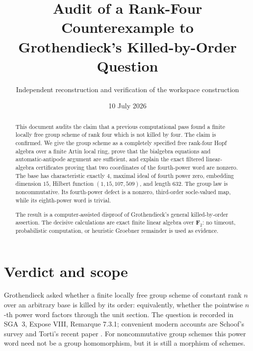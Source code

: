 \documentclass[11pt]{article}
\title{Audit of a Rank-Four Counterexample to\\
Grothendieck's Killed-by-Order Question}
\author{Independent reconstruction and verification of the workspace construction}
\date{10 July 2026}
\theoremstyle{remark}
\newcommand{\F}{\mathbf F}
\begin{document}
\maketitle

\begin{abstract}
This document audits the claim that a previous computational pass found a
finite locally free group scheme of rank four which is not killed by four.
The claim is confirmed.  We give the group scheme as a completely specified
free rank-four Hopf algebra over a finite Artin local ring, prove that the
bialgebra equations and automatic-antipode argument are sufficient, and
explain the exact filtered linear-algebra certificates proving that two
coordinates of the fourth-power word are nonzero.  The base has
characteristic exactly \(4\), maximal ideal of fourth power zero, embedding
dimension \(15\), Hilbert function \((1,15,107,509)\), and length \(632\).
The group law is noncommutative.  Its fourth-power defect is a nonzero,
third-order socle-valued map, while its eighth-power word is trivial.

The result is a computer-assisted disproof of Grothendieck's general
killed-by-order assertion.  The decisive calculations are exact finite
linear algebra over \(\F_2\): no timeout, probabilistic computation, or
heuristic Groebner remainder is used as evidence.
\end{abstract}

\begin{center}
\end{center}
\medskip

\tableofcontents

\section{Verdict and scope}

Grothendieck asked whether a finite locally free group scheme of constant
rank \(n\) over an arbitrary base is killed by its order: equivalently,
whether the pointwise \(n\)-th power word factors through the unit section.
The question is recorded in SGA~3, Expose VIII, Remarque 7.3.1; convenient
modern accounts are Schoof's survey and Torti's recent paper
\cite{SGA3,SchoofSurvey,Torti}.  For noncommutative group schemes this power
word need not be a group homomorphism, but it is still a morphism of schemes.
\end{document}
